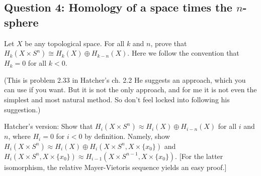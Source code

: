\subsection{Question 4: Homology of a space times the $n$-sphere}
\begin{prob}
    Let $X$ be any topological space.  For all $k$ and $n$, prove that $H_k(X\times S^n)\cong H_k(X)\oplus H_{k-n}(X)$.  Here we follow the convention that $H_k=0$ for all $k<0$.  

    (This is problem 2.33 in Hatcher's ch. 2.2  He suggests an approach, which you can use if you want.  But it is not the only approach, and for me it is not even the simplest and most natural method. So don't feel locked into following his suggestion.)

    Hatcher's version: Show that $H_i (X\times S^n )\approx H_i (X)\oplus H_{i-n}(X)$ for all $i$ and $n$, where $H_i =0$ for $i<0$ by definition. Namely, show $H_i (X\times S^n )\approx H_i (X)\oplus H_i (X\times S^n, X\times \{x_0\} )$ and $H_i (X\times S^n , X\times \{x_0\} )\approx H_{i-1}(X\times S^{n-1}, X\times \{x_0\} )$. [For the latter isomorphism, the relative Mayer-Vietoris sequence yields an easy proof.]
\end{prob}
